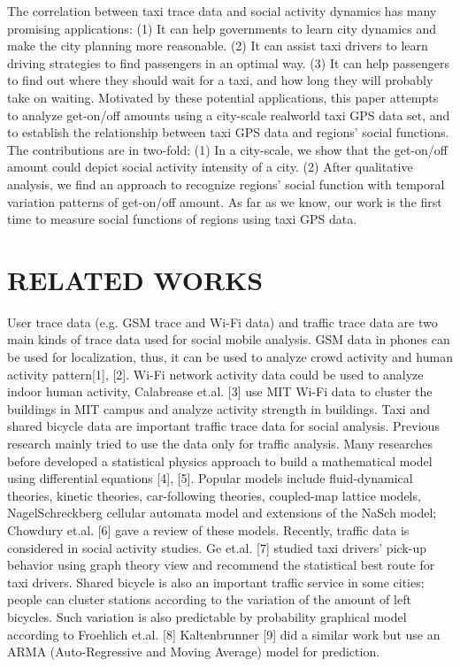 \documentclass[a4paper, 10pt, conference]{ieeeconf}      %
\begin{document}
The correlation between taxi trace data and social activity dynamics has many promising applications: (1) It can help governments to learn city dynamics and make the city planning more reasonable. (2) It can assist taxi drivers to learn driving strategies to find passengers in an optimal way. (3) It can help passengers to find out where they should wait for a taxi, and how long they will probably take on waiting.
Motivated by these potential applications, this paper attempts to analyze get-on/off amounts using a city-scale realworld taxi GPS data set, and to establish the relationship between taxi GPS data and regions’ social functions. The contributions are in two-fold: (1) In a city-scale, we show that the get-on/off amount could depict social activity intensity of a city. (2) After qualitative analysis, we find an approach to recognize regions’ social function with temporal variation patterns of get-on/off amount. As far as we know, our work is the first time to measure social functions of regions using taxi GPS data.

\section{RELATED WORKS}%

User trace data (e.g. GSM trace and Wi-Fi data) and traffic trace data are two main kinds of trace data used for social mobile analysis. GSM data in phones can be used for localization, thus, it can be used to analyze crowd activity and human activity pattern[1], [2]. Wi-Fi network activity data could be used to analyze indoor human activity, Calabrease et.al. [3] use MIT Wi-Fi data to cluster the buildings in MIT campus and analyze activity strength in buildings.
Taxi and shared bicycle data are important traffic trace data for social analysis. Previous research mainly tried to use the data only for traffic analysis. Many researches before developed a statistical physics approach to build a mathematical model using differential equations [4], [5]. Popular models include fluid-dynamical theories, kinetic theories, car-following theories, coupled-map lattice models, NagelSchreckberg cellular automata model and extensions of the NaSch model; Chowdury et.al. [6] gave a review of these models.
Recently, traffic data is considered in social activity studies. Ge et.al. [7] studied taxi drivers’ pick-up behavior using graph theory view and recommend the statistical best route for taxi drivers. Shared bicycle is also an important traffic service in some cities; people can cluster stations according to the variation of the amount of left bicycles. Such variation is also predictable by probability graphical model according to Froehlich et.al. [8] Kaltenbrunner [9] did a similar work but use an ARMA (Auto-Regressive and Moving Average) model for prediction.
\end{document}
